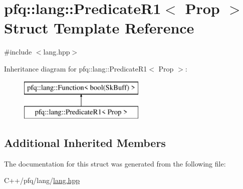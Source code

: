 \hypertarget{structpfq_1_1lang_1_1PredicateR1}{\section{pfq\+:\+:lang\+:\+:Predicate\+R1$<$ Prop $>$ Struct Template Reference}
\label{structpfq_1_1lang_1_1PredicateR1}
}


{\ttfamily \#include $<$lang.\+hpp$>$}

Inheritance diagram for pfq\+:\+:lang\+:\+:Predicate\+R1$<$ Prop $>$\+:\begin{figure}[H]
\begin{center}
\leavevmode
\includegraphics[height=2.000000cm]{structpfq_1_1lang_1_1PredicateR1}
\end{center}
\end{figure}
\subsection*{Additional Inherited Members}


The documentation for this struct was generated from the following file\+:\begin{DoxyCompactItemize}
\item 
C++/pfq/lang/\hyperlink{lang_8hpp}{lang.\+hpp}\end{DoxyCompactItemize}
